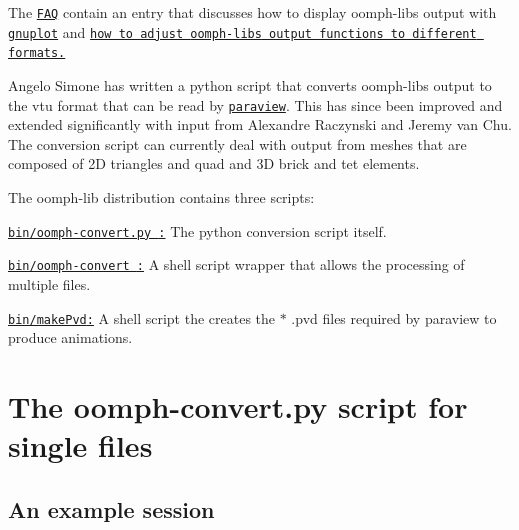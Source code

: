 The \href{../../FAQ/html/index.html}{\tt F\+AQ} contain an entry that discusses how to display {\ttfamily oomph-\/lib\textquotesingle{}s} output with \href{http://www.gnuplot.info}{\tt gnuplot} and \href{../../FAQ/html/index.html#tecplot}{\tt how to adjust {\ttfamily oomph-\/lib\textquotesingle{}s} output functions to different formats.}

Angelo Simone has written a python script that converts {\ttfamily oomph-\/lib\textquotesingle{}s} output to the vtu format that can be read by \href{http://www.paraview.org}{\tt paraview}. This has since been improved and extended significantly with input from Alexandre Raczynski and Jeremy van Chu. The conversion script can currently deal with output from meshes that are composed of 2D triangles and quad and 3D brick and tet elements.

The {\ttfamily oomph-\/lib} distribution contains three scripts\+:


\begin{DoxyItemize}
\item \href{../../../bin/oomph-convert.py}{\tt {\ttfamily bin/oomph-\/convert.\+py }\+:} The python conversion script itself. ~\newline
~\newline

\item \href{../../../bin/oomph-convert}{\tt {\ttfamily bin/oomph-\/convert }\+:} A shell script wrapper that allows the processing of multiple files. ~\newline
~\newline

\item \href{../../../bin/makePvd}{\tt {\ttfamily bin/make\+Pvd}\+:} A shell script the creates the {\ttfamily $\ast$} {\ttfamily }.pvd files required by paraview to produce animations.
\end{DoxyItemize}

 

\hypertarget{index_py}{}\section{The oomph-\/convert.\+py script for single files}\label{index_py}
\hypertarget{index_py_sample}{}\subsection{An example session}\label{index_py_sample}

